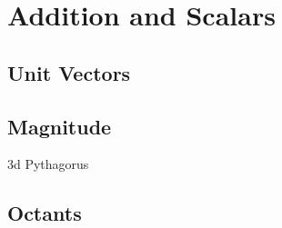 

\newpage
\chapterminitoc


\newpage
\section{Addition and Scalars}
\noindent{}
\subsection{Unit Vectors}
\subsection{Magnitude}
3d Pythagorus
\subsection{Octants}

